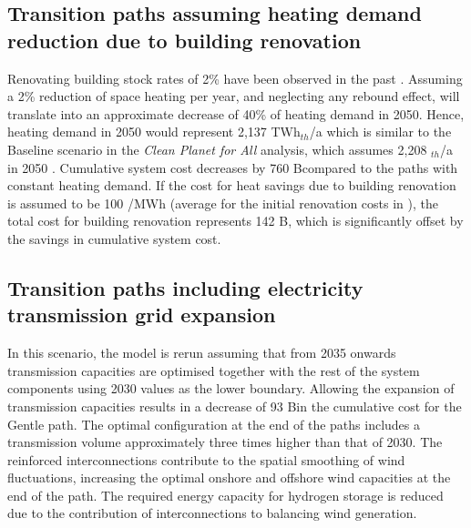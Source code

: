 \documentclass[3p]{elsarticle} %
\begin{document}

\subsection{Transition paths assuming heating demand reduction due to building renovation}

Renovating building stock rates of 2\% have been observed in the past \cite{agora}. Assuming a 2\% reduction of space heating per year, and neglecting any rebound effect, will translate into an approximate decrease of 40\% of heating demand in 2050. Hence, heating demand in 2050 would represent 2,137 TWh$_{th}$/a which is similar to the Baseline scenario in the \textsl{Clean Planet for All} analysis, which assumes 2,208 $_{th}$/a in 2050 \cite{in-depth_2018}. Cumulative system cost decreases by 760 B\EUR compared to the paths with constant heating demand. If the cost for heat savings due to building renovation is assumed to be 100 \EUR/MWh (average for the initial renovation costs in \cite{Brown_2018}), the total cost for building renovation represents 142 B\EUR, which is significantly offset by the savings in cumulative system cost. 

\subsection{Transition paths including electricity transmission grid expansion}

In this scenario, the model is rerun assuming that from 2035 onwards transmission capacities are optimised together with the rest of the system components using 2030 values as the lower boundary. Allowing the expansion of transmission capacities results in a decrease of 93 B\EUR in the cumulative cost for the Gentle path. The optimal configuration at the end of the paths includes a transmission volume approximately three times higher than that of 2030. The reinforced interconnections contribute to the spatial smoothing of wind fluctuations, increasing the optimal onshore and offshore wind capacities at the end of the path. The required energy capacity for hydrogen storage is reduced due to the contribution of interconnections to balancing wind generation. 
\end{document}
